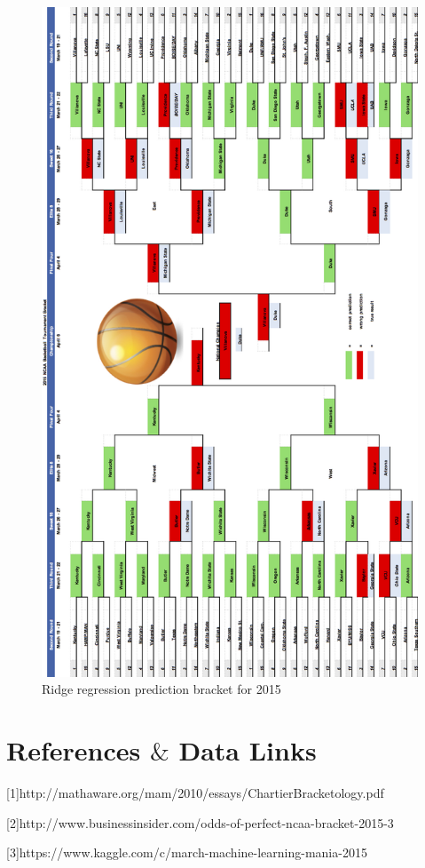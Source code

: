 \documentclass{article} %
\begin{document}
\begin{figure}[H]
\begin{center}
   \includegraphics[scale = 0.3]{bracket.jpg}

\caption{Ridge regression prediction bracket for 2015}
\end{center}
\end{figure}


\section{References $\&$ Data Links}
[1]http://mathaware.org/mam/2010/essays/ChartierBracketology.pdf

[2]http://www.businessinsider.com/odds-of-perfect-ncaa-bracket-2015-3

[3]https://www.kaggle.com/c/march-machine-learning-mania-2015
\end{document}
